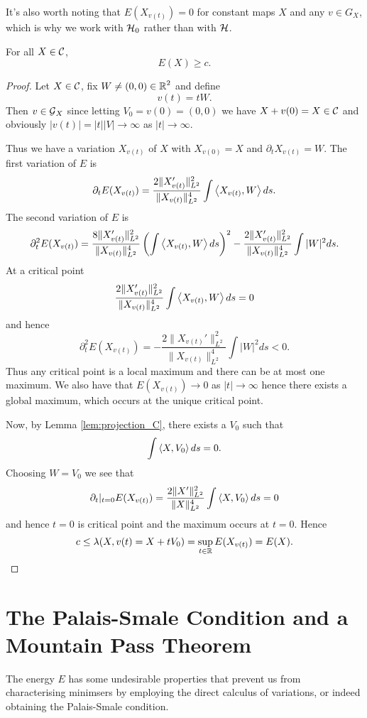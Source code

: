 \documentclass[12pt]{article}
\begin{document}
It's also worth noting that \(E(X_{v(t)}) = 0\) for constant maps \(X\) and any \(v \in G_X\), which is why we work with \(\operatorname{\operatorname{\mathcal{H}}_0}\) rather than with \(\operatorname{\mathcal{H}}\).

\begin{lemma}
\label{lem:E_bounded_by_c}
For all \(X \in \operatorname{\mathcal{C}}\),
\[
E(X) \geq c.
\]
\end{lemma}

\begin{proof}
Let \(X \in \operatorname{\mathcal{C}}\), fix \(W \ne (0, 0) \in \operatorname{\mathbb{R}}^2\) and define
\[
v(t) = t W.
\]
Then \(v \in \operatorname{\mathcal{G}}_X\) since letting \(V_0 = v(0) = (0, 0)\) we have \(X + v(0) = X \in \operatorname{\mathcal{C}}\) and obviously \(|v(t)| = |t| |V| \to \infty\) as \(|t| \to \infty\).

Thus we have a variation \(X_{v(t)}\) of \(X\) with \(X_{v(0)} = X\) and \(\partial_t X_{v(t)} = W\). The first variation of \(E\) is
\[
\partial_t E(X_{v(t)}) = \frac{2\|X_{v(t)}'\|_{L^2}^2}{\|X_{v(t)}\|_{L^2}^4} \int \left\langle{X_{v(t)}},{W}\right\rangle ds.
\]
The second variation of \(E\) is
\[
\partial_t^2 E(X_{v(t)}) = \frac{8\|X_{v(t)}'\|_{L^2}^2}{\|X_{v(t)}\|_{L^2}^4} \left(\int \left\langle{X_{v(t)}},{W}\right\rangle ds\right)^2 - \frac{2\|X_{v(t)}'\|_{L^2}^2}{\|X_{v(t)}\|_{L^2}^4} \int |W|^2 ds.
\]
At a critical point
\[
\frac{2\|X_{v(t)}'\|_{L^2}^2}{\|X_{v(t)}\|_{L^2}^4} \int \left\langle{X_{v(t)}},{W}\right\rangle ds = 0
\]
and hence
\[
\partial_t^2 E(X_{v(t)}) = - \frac{2\|X_{v(t)}'\|_{L^2}^2}{\|X_{v(t)}\|_{L^2}^4} \int |W|^2 ds < 0.
\]
Thus any critical point is a local maximum and there can be at most one maximum. We also have that \(E(X_{v(t)}) \to 0\) as \(|t| \to \infty\) hence there exists a global maximum, which occurs at the unique critical point.

Now, by Lemma \ref{lem:projection_C}, there exists a \(V_0\) such that
\[
\int \left\langle{X},{V_0}\right\rangle ds = 0.
\]
Choosing \(W = V_0\) we see that
\[
\partial_t|_{t=0} E(X_{v(t)}) = \frac{2\|X'\|_{L^2}^2}{\|X\|_{L^2}^4} \int \left\langle{X},{V_0}\right\rangle ds = 0
\]
and hence \(t = 0\) is critical point and the maximum occurs at \(t = 0\). Hence
\[
c \leq \lambda(X, v(t) = X + tV_0) = \sup_{t \in \operatorname{\mathbb{R}}} E(X_{v(t)}) = E(X).
\]
\end{proof}

\section{The Palais-Smale Condition and a Mountain Pass Theorem}
\label{sec-3}

The energy \(E\) has some undesirable properties that prevent us from characterising minimsers by employing the direct calculus of variations, or indeed obtaining the Palais-Smale condition.
\end{document}
